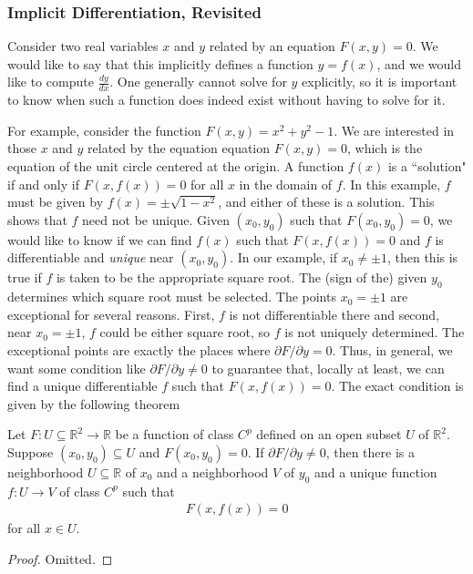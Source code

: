 \documentclass[12pt,letterpaper,reqno]{article}
\numberwithin{equation}{section}
\newcommand{\R}{\ensuremath{\mathbb R}}
\begin{document}
{\subsubsection{Implicit Differentiation, Revisited}
Consider two real variables $x$ and $y$ related by an equation $F(x,y)=0$. We would like to say that this implicitly defines a function $y=f(x)$, and we would like to compute $\frac{dy}{dx}$. One generally cannot solve for $y$ explicitly, so it is important to know when such a function does indeed exist without having to solve for it.


For example, consider the function $F(x,y)=x^2+y^2-1$. We are interested in those $x$ and $y$ related by the equation equation $F(x,y)=0$, which is the equation of the unit circle centered at the origin. A function $f(x)$ is a ``solution" if and only if $F(x,f(x))=0$ for all $x$ in the domain of $f$. In this example, $f$ must be given by $f(x)=\pm \sqrt{1-x^2}$, and either of these is a solution. This shows that $f$ need not be unique. Given $(x_0,y_0)$ such that $F(x_0,y_0)=0$, we would like to know if we can find $f(x)$ such that $F(x,f(x))=0$ and $f$ is differentiable and \emph{unique} near $(x_0,y_0)$. In our example, if $x_0 \neq \pm 1$, then this is true if $f$ is taken to be the appropriate square root. The (sign of the) given $y_0$ determines which square root must be selected. The points $x_0=\pm 1$ are exceptional for several reasons. First, $f$ is not differentiable there and second, near $x_0=\pm 1$, $f$ could be either square root, so $f$ is not uniquely determined. The exceptional points are exactly the places where $\partial F/\partial y=0$. Thus, in general, we want some condition like $\partial F/\partial y \neq 0$ to guarantee that, locally at least, we can find a unique differentiable $f$ such that $F(x,f(x))=0$. The exact condition is given by the following theorem

\begin{thm}
	Let $F:U \subseteq \R^2 \to \R$ be a function of class $C^p$ defined on an open subset $U$ of $\R^2$. Suppose $(x_0,y_0) \subseteq U$ and $F(x_0,y_0)=0$. If $\partial F/\partial y \neq 0$, then there is a neighborhood $U \subseteq \R$ of $x_0$ and a neighborhood $V$ of $y_0$ and a unique function $f:U \to V$ of class $C^p$ such that 
	\begin{align*}
		F(x,f(x))=0
	\end{align*}
	for all $x \in U$. 
\end{thm}

\begin{proof}
	Omitted.
\end{proof}

}
\end{document}
